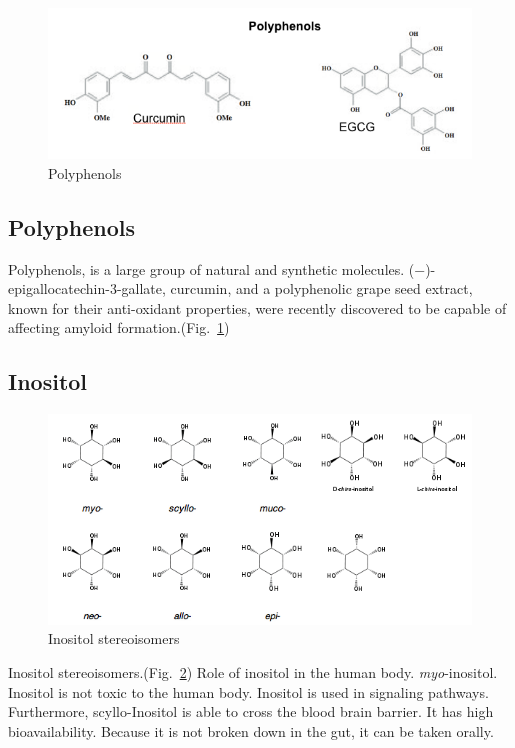 \begin{figure}
\centering
\includegraphics[width=6in]{figures/introduction/polyphenols.png}
\caption[Small molecule binders]{Polyphenols}
\label{fig:polyphenols}
\end{figure}

\subsection{Polyphenols}
Polyphenols,  is a large group of natural and synthetic molecules.  (−)-epigallocatechin-3-gallate, curcumin, and a polyphenolic grape seed extract, known for their anti-oxidant properties,  were recently discovered to be capable of affecting amyloid formation.(Fig.~\ref{fig:polyphenols})

\subsection{Inositol}
\begin{figure}
\centering
\includegraphics[width=6in]{figures/introduction/inositol.png}
\caption[Inositol]{Inositol stereoisomers}
\label{fig:inositols}
\end{figure}

Inositol stereoisomers.(Fig.~\ref{fig:inositols}) Role of inositol in the human body. \emph{myo}-inositol.  
Inositol is not toxic to the human body.  Inositol is used in signaling pathways. Furthermore, scyllo-Inositol is able to cross the blood brain barrier. It has high bioavailability. Because it is not broken down in the gut, it can be taken orally.

